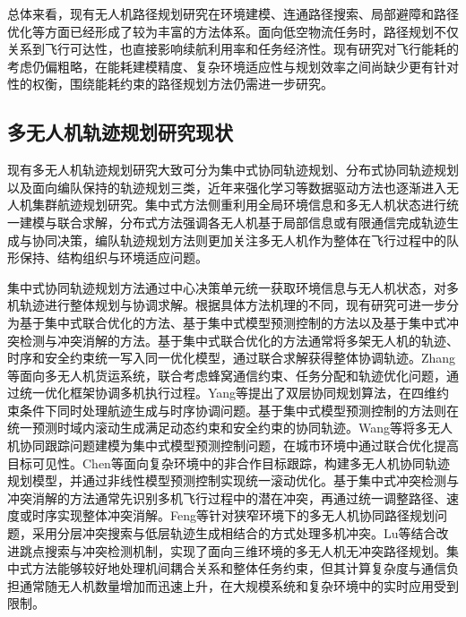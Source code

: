 总体来看，现有无人机路径规划研究在环境建模、连通路径搜索、局部避障和路径优化等方面已经形成了较为丰富的方法体系。面向低空物流任务时，路径规划不仅关系到飞行可达性，也直接影响续航利用率和任务经济性。现有研究对飞行能耗的考虑仍偏粗略，在能耗建模精度、复杂环境适应性与规划效率之间尚缺少更有针对性的权衡，围绕能耗约束的路径规划方法仍需进一步研究。

\subsection{多无人机轨迹规划研究现状}

现有多无人机轨迹规划研究大致可分为集中式协同轨迹规划、分布式协同轨迹规划以及面向编队保持的轨迹规划三类，近年来强化学习等数据驱动方法也逐渐进入无人机集群航迹规划研究\cite{KJDZ202506001}。集中式方法侧重利用全局环境信息和多无人机状态进行统一建模与联合求解，分布式方法强调各无人机基于局部信息或有限通信完成轨迹生成与协同决策，编队轨迹规划方法则更加关注多无人机作为整体在飞行过程中的队形保持、结构组织与环境适应问题。

集中式协同轨迹规划方法通过中心决策单元统一获取环境信息与无人机状态，对多机轨迹进行整体规划与协调求解。根据具体方法机理的不同，现有研究可进一步分为基于集中式联合优化的方法、基于集中式模型预测控制的方法以及基于集中式冲突检测与冲突消解的方法。基于集中式联合优化的方法通常将多架无人机的轨迹、时序和安全约束统一写入同一优化模型，通过联合求解获得整体协调轨迹。Zhang等面向多无人机货运系统，联合考虑蜂窝通信约束、任务分配和轨迹优化问题，通过统一优化框架协调多机执行过程\cite{zhang2025cargo}。Yang等提出了双层协同规划算法，在四维约束条件下同时处理航迹生成与时序协调问题\cite{yang2025twolayer}。基于集中式模型预测控制的方法则在统一预测时域内滚动生成满足动态约束和安全约束的协同轨迹。Wang等将多无人机协同跟踪问题建模为集中式模型预测控制问题，在城市环境中通过联合优化提高目标可见性\cite{wang2022visibility}。Chen等面向复杂环境中的非合作目标跟踪，构建多无人机协同轨迹规划模型，并通过非线性模型预测控制实现统一滚动优化\cite{chen2025nmpc}。基于集中式冲突检测与冲突消解的方法通常先识别多机飞行过程中的潜在冲突，再通过统一调整路径、速度或时序实现整体冲突消解。Feng等针对狭窄环境下的多无人机协同路径规划问题，采用分层冲突搜索与低层轨迹生成相结合的方式处理多机冲突\cite{feng2024cramped}。Lu等结合改进跳点搜索与冲突检测机制，实现了面向三维环境的多无人机无冲突路径规划\cite{lu2025conflict}。集中式方法能够较好地处理机间耦合关系和整体任务约束，但其计算复杂度与通信负担通常随无人机数量增加而迅速上升，在大规模系统和复杂环境中的实时应用受到限制。

